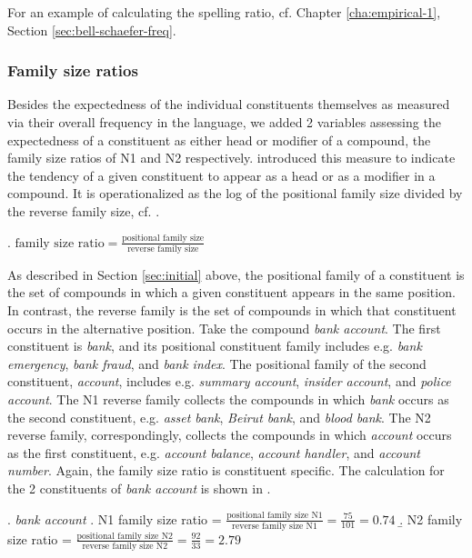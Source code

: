 For an example of calculating the spelling ratio, cf. Chapter \ref{cha:empirical-1}, Section \ref{sec:bell-schaefer-freq}.
\subsubsection{Family size ratios}
\label{sec:famsizeratios}

Besides the expectedness of the individual constituents themselves as
measured via their overall frequency in the language, we added 2
 variables assessing the expectedness of a constituent as
either head or modifier of a compound, the family size ratios of N1
and N2 respectively. \citet{BellandPlag:2012} introduced this measure
to indicate the tendency of a given constituent to appear as a head or
as a modifier in a compound. It is operationalized as the log of the
positional family size divided by the reverse family size, cf. \Next.

\ex. \( \displaystyle \text{family size ratio} = \frac{\textrm{positional family size}}{\textrm{reverse family size}} \)

As described in Section \ref{sec:initial} above, the positional family of a
constituent is the set of compounds in which a given constituent
appears in the same position. In contrast, the reverse family is the
set of compounds in which that constituent occurs in the alternative
position. Take the compound \emph{bank account}. The first constituent
is \emph{bank}, and its positional constituent family includes
e.g. \emph{bank emergency}, \emph{bank fraud}, and \emph{bank
  index}. The positional family of the second constituent, \emph{account},
includes e.g. \emph{summary account}, \emph{insider account}, and
\emph{police account}. The N1 reverse family collects the compounds in
which \emph{bank} occurs as the second constituent, e.g. \emph{asset
  bank}, \emph{Beirut bank}, and \emph{blood bank}.  The N2 reverse
family, correspondingly, collects the compounds in which
\emph{account} occurs as the first constituent,  e.g. \emph{account
  balance}, \emph{account handler}, and \emph{account number}. Again,
the family size ratio is constituent specific. The calculation for the
2 constituents of \emph{bank account} is shown in \Next.

\ex. \emph{bank account}
\a. N1 family size ratio = 
\( \displaystyle \frac{\textrm{positional family size N1}}{\textrm{reverse
family size N1}} =\frac{75}{101} = 0.74 \) \vspace*{.5em}
\b. N2 family size ratio = 
\( \displaystyle \frac{\textrm{positional family size N2}}{\textrm{reverse family size N2}} = \frac{92}{33} = 2.79 \)

